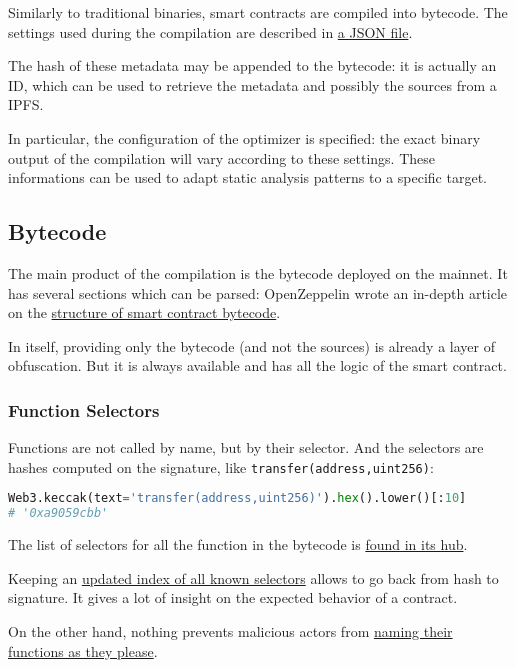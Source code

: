 Similarly to traditional binaries, smart contracts are compiled into bytecode.
The settings used during the compilation are described in \href{\urldocssoliditymetadata}{a JSON file}.

The hash of these metadata may be appended to the bytecode:
it is actually an ID, which can be used to retrieve the metadata and possibly the sources from a IPFS.

In particular, the configuration of the optimizer is specified: the exact binary output of the compilation will vary according to these settings.
These informations can be used to adapt static analysis patterns to a specific target.

\subsection{Bytecode}

The main product of the compilation is the bytecode deployed on the mainnet.
It has several sections which can be parsed: OpenZeppelin wrote an in-depth article on the \href{\urldiagrambytecode}{structure of smart contract bytecode}.

In itself, providing only the bytecode (and not the sources) is already a layer of obfuscation.
But it is always available and has all the logic of the smart contract.

\subsubsection{Function Selectors}

Functions are not called by name, but by their selector.
And the selectors are hashes computed on the signature, like \lstinline[language=Solidity]{transfer(address,uint256)}:

\begin{lstlisting}[language=Python]
Web3.keccak(text='transfer(address,uint256)').hex().lower()[:10]
# '0xa9059cbb'
\end{lstlisting}

The list of selectors for all the function in the bytecode is \href{\urldiagrambytecode}{found in its hub}.

Keeping an \href{\urlwebindexselectors}{updated index of all known selectors} allows to go back from hash to signature.
It gives a lot of insight on the expected behavior of a contract.

On the other hand, nothing prevents malicious actors from \href{https://www.4byte.directory/signatures/?bytes4_signature=0xa9059cbb}{naming their functions as they please}.

